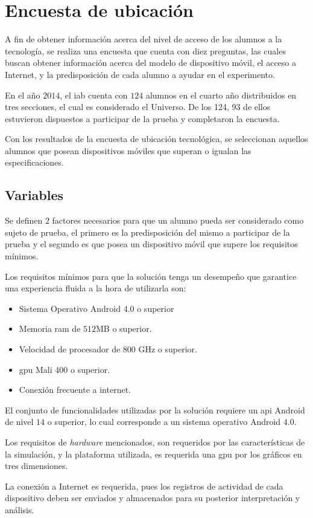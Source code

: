 
\section{Encuesta de ubicación}
\label{sec:ubicacion}


A fin de obtener información acerca del nivel de acceso  de los alumnos a la
tecnología, se realiza una encuesta que cuenta con diez preguntas, las cuales
buscan obtener información acerca del modelo de dispositivo móvil, el acceso a
Internet, y la predisposición de cada alumno a ayudar en el experimento.

En el año $2014$, el \Gls{iab} cuenta con $124$ alumnos en el cuarto año distribuidos en
tres secciones, el cual es considerado el Universo. De los 124, 93 de
ellos estuvieron dispuestos a participar de la prueba y completaron la encuesta.

Con los resultados de la encuesta de ubicación tecnológica, se seleccionan
aquellos alumnos que posean dispositivos móviles que superan o igualan las
especificaciones.


\subsection{Variables}

Se definen $2$ factores necesarios para que un alumno pueda ser considerado como
sujeto de prueba, el primero es la predisposición del mismo a participar de la
prueba y el segundo es que posea un dispositivo móvil que supere los requisitos
mínimos.

Los requisitos mínimos para que la solución tenga un desempeño que garantice una
experiencia fluida a la hora de utilizarla son:

\begin{itemize}
    \item Sistema Operativo Android $4.0$ o superior
    \item Memoria ram de $512$MB o superior.
    \item Velocidad de procesador de $800$ GHz o superior.
    \item \Gls{gpu} Mali 400 o superior.
    \item Conexión frecuente a internet.
\end{itemize}

El conjunto de funcionalidades utilizadas por la solución requiere un \Gls{api}
Android de nivel $14$\cite{android:api} o superior, lo cual corresponde a un
sistema operativo Android $4.0$.

Los requisitos de \textit{hardware} mencionados, son requeridos por las
características de la simulación, y la plataforma utilizada, es requerida una
\Gls{gpu} por los gráficos en tres dimensiones.

La conexión a Internet es requerida, pues los registros de actividad de cada
dispositivo deben ser enviados y almacenados para su posterior interpretación y
análisis.
